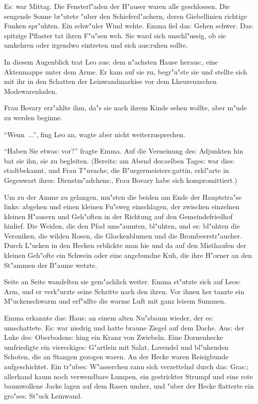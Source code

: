 \documentclass[oneside,12pt]{book}
\newcommand{\s}{s:}%
\begin{document}
E{\s} war Mittag. Die Fensterl"aden der H"auser waren alle
geschlossen. Die sengende Sonne br"utete "uber den Schieferd"achern,
deren Giebellinien richtige Funken spr"uhten. Ein schw"uler Wind
wehte. Emma fiel da{\s} Gehen schwer. Da{\s} spitzige Pflaster tat
ihren F"u"sen weh. Sie ward sich unschl"ussig, ob sie umkehren
oder irgendwo eintreten und sich au{\s}ruhen sollte.

In diesem Augenblick trat Leo au{\s} dem n"achsten Hause
herau{\s}, eine Aktenmappe unter dem Arme. Er kam auf sie zu,
begr"u"ste sie und stellte sich mit ihr in den Schatten der
Leinwandmarkise vor dem Lheureuxschen Modewarenladen.

Frau Bovary erz"ahlte ihm, da"s sie nach ihrem Kinde sehen wollte,
aber m"ude zu werden beginne.

"`Wenn~..."', fing Leo an, wagte aber nicht weiterzusprechen.

"`Haben Sie etwa{\s} vor?"' fragte Emma. Auf die Verneinung de{\s}
Adjunkten hin bat sie ihn, sie zu begleiten. (Bereit{\s} am Abend
de{\s}selben Tage{\s} war die{\s} stadtbekannt, und Frau T"uvache,
die B"urgermeister{\s}gattin, erkl"arte in Gegenwart ihre{\s}
Dienstm"adchen{\s}, Frau Bovary habe sich kompromittiert.)

Um zu der Amme zu gelangen, mu"sten die beiden am Ende der
Hauptstra"se link{\s} abgehen und einen kleinen Fu"sweg
einschlagen, der zwischen einzelnen kleinen H"ausern und Geh"often
in der Richtung auf den Gemeindefriedhof hinlief. Die Weiden, die
den Pfad ums"aumten, bl"uhten, und e{\s} bl"uhten die Veroniken,
die wilden Rosen, die Glockenblumen und die Brombeerstr"aucher.
Durch L"ucken in den Hecken erblickte man hie und da auf den
Misthaufen der kleinen Geh"ofte ein Schwein oder eine angebundne
Kuh, die ihre H"orner an den St"ammen der B"aume wetzte.

Seite an Seite wandelten sie gem"achlich weiter. Emma st"utzte
sich auf Leo{\s} Arm, und er verk"urzte seine Schritte nach den
ihren. Vor ihnen her tanzte ein M"uckenschwarm und erf"ullte die
warme Luft mit ganz leisem Summen.

Emma erkannte da{\s} Hau{\s} an einem alten Nu"sbaum wieder, der
e{\s} umschattete. E{\s} war niedrig und hatte braune Ziegel auf
dem Dache. Au{\s} der Luke de{\s} Oberboden{\s} hing ein Kranz von
Zwiebeln. Eine Dornenhecke umfriedigte ein viereckige{\s}
G"artlein mit Salat, Lavendel und bl"uhenden Schoten, die an
Stangen gezogen waren. An der Hecke waren Reisigbunde
aufgeschichtet. Ein tr"ube{\s} W"asserchen rann sich verzettelnd
durch da{\s} Gra{\s}; allerhand kaum noch verwendbare Lumpen, ein
gestrickter Strumpf und eine rote baumwollene Jacke lagen auf dem
Rasen umher, und "uber der Hecke flatterte ein gro"se{\s} St"uck
Leinwand.
\end{document}
